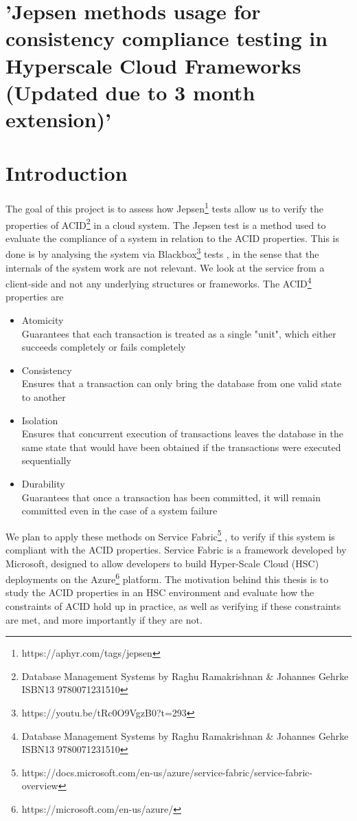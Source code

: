 \section{'Jepsen methods usage for consistency compliance testing in Hyperscale Cloud Frameworks (Updated due to 3 month extension)'}

\section{Introduction}
The goal of this project is to assess how Jepsen\footnote[1]{https://aphyr.com/tags/jepsen } tests allow us to verify the properties of ACID\footnote[2]{Database Management Systems by Raghu Ramakrishnan \& Johannes Gehrke  ISBN13 9780071231510} in a cloud system.
The Jepsen test is a method used to evaluate the compliance of a system in relation to the ACID properties. This is done is by analysing the system via Blackbox\footnote[3]{https://youtu.be/tRc0O9VgzB0?t=293} tests , in the sense that the internals of the system work are not relevant. We look at the service from a client-side and not any underlying structures or frameworks.
The ACID\footnote[2]{Database Management Systems by Raghu Ramakrishnan \& Johannes Gehrke  ISBN13 9780071231510} properties are 
\begin{itemize}
\item	Atomicity \\
Guarantees that each transaction is treated as a single "unit", which either succeeds completely or fails completely 
\item	Consistency \\
Ensures that a transaction can only bring the database from one valid state to another
\item	Isolation \\
Ensures that concurrent execution of transactions leaves the database in the same state that would have been obtained if the transactions were executed sequentially 
\item	Durability \\
Guarantees that once a transaction has been committed, it will remain committed even in the case of a system failure 
\end{itemize}

We plan to apply these methods on Service Fabric\footnote[4]{https://docs.microsoft.com/en-us/azure/service-fabric/service-fabric-overview  } , to verify if this system is compliant with the ACID properties. Service Fabric is a framework developed by Microsoft, designed to allow developers to build Hyper-Scale Cloud (HSC) deployments on the Azure\footnote[5]{https://microsoft.com/en-us/azure/ } platform.
The motivation behind this thesis is to study the ACID properties in an HSC environment and evaluate how the constraints of ACID hold up in practice, as well as verifying if these constraints are met, and more importantly if they are not. 
